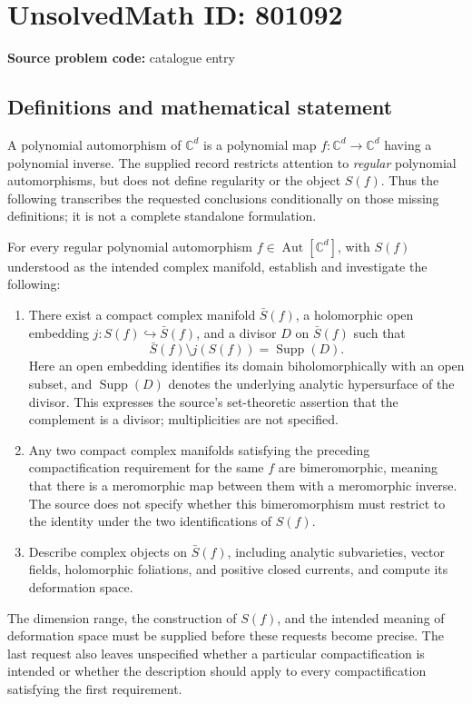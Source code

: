 \documentclass[11pt]{article}
\newcommand{\C}{\mathbb{C}}
\begin{document}
\section*{UnsolvedMath ID: 801092}
\textbf{Source problem code:} catalogue entry
\subsection{Definitions and mathematical statement}
A polynomial automorphism of \(\C^d\) is a polynomial map \(f:\C^d\to\C^d\) having a polynomial inverse. The supplied record restricts attention to \emph{regular} polynomial automorphisms, but does not define regularity or the object \(S(f)\). Thus the following transcribes the requested conclusions conditionally on those missing definitions; it is not a complete standalone formulation.

For every regular polynomial automorphism \(f\in\operatorname{Aut}[\C^d]\), with \(S(f)\) understood as the intended complex manifold, establish and investigate the following:
\begin{enumerate}
\item There exist a compact complex manifold \(\bar S(f)\), a holomorphic open embedding \(j:S(f)\hookrightarrow\bar S(f)\), and a divisor \(D\) on \(\bar S(f)\) such that
\[
\bar S(f)\setminus j(S(f))=\operatorname{Supp}(D).
\]
Here an open embedding identifies its domain biholomorphically with an open subset, and \(\operatorname{Supp}(D)\) denotes the underlying analytic hypersurface of the divisor. This expresses the source's set-theoretic assertion that the complement is a divisor; multiplicities are not specified.
\item Any two compact complex manifolds satisfying the preceding compactification requirement for the same \(f\) are bimeromorphic, meaning that there is a meromorphic map between them with a meromorphic inverse. The source does not specify whether this bimeromorphism must restrict to the identity under the two identifications of \(S(f)\).
\item Describe complex objects on \(\bar S(f)\), including analytic subvarieties, vector fields, holomorphic foliations, and positive closed currents, and compute its deformation space.
\end{enumerate}
The dimension range, the construction of \(S(f)\), and the intended meaning of deformation space must be supplied before these requests become precise. The last request also leaves unspecified whether a particular compactification is intended or whether the description should apply to every compactification satisfying the first requirement.
\end{document}
